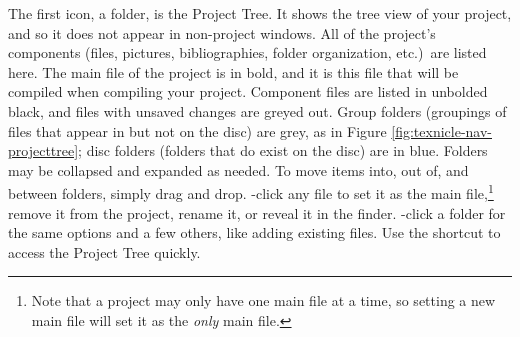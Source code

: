 The first icon, a folder, is the Project Tree. It shows the tree view of your project, and so it does not appear in non-project windows. All of the project's components (files, pictures, bibliographies, folder organization, etc.)\ are listed here. The main file of the project is in bold, and it is this file that will be compiled when compiling your project. Component files are listed in unbolded black, and files with unsaved changes are greyed out. Group folders (groupings of files that appear in \texnicle but not on the disc) are grey, as in Figure \ref{fig:texnicle-nav-projecttree}; disc folders (folders that do exist on the disc) are in blue. Folders may be collapsed and expanded as needed. To move items into, out of, and between folders, simply drag and drop. \keys{\cmdkey}-click any file to set it as the main file,\footnote{Note that a project may only have one main file at a time, so setting a new main file will set it as the \emph{only} main file.} remove it from the project, rename it, or reveal it in the finder. \keys{\cmdkey}-click a folder for the same options and a few others, like adding existing files. Use the shortcut  to access the Project Tree quickly.

